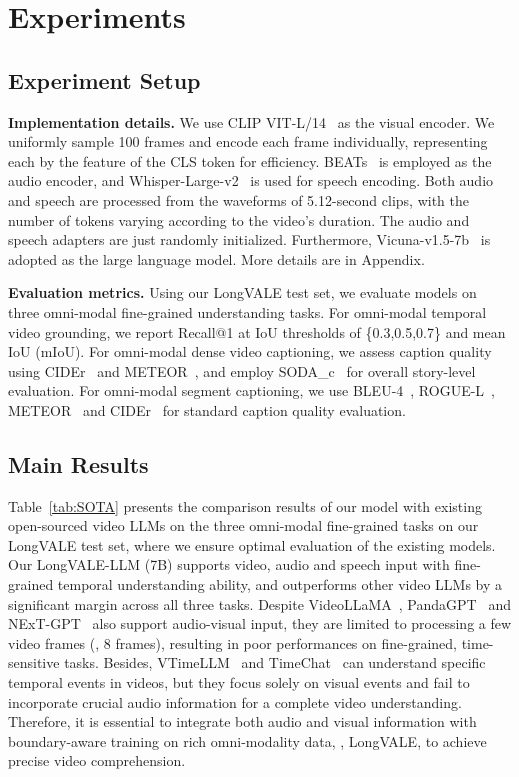 \section{Experiments}


\subsection{Experiment Setup}
\noindent\textbf{Implementation details.}
We use CLIP VIT-L/14~\cite{radford2021learning} as the visual encoder. We uniformly sample 100 frames and encode each frame individually, representing each by the feature of the CLS token for efficiency. BEATs~\cite{chen2022beats} is employed as the audio encoder, and Whisper-Large-v2~\cite{radford2023robust} is used for speech encoding. Both audio and speech are processed from the waveforms of 5.12-second clips, with the number of tokens varying according to the video's duration. 
The audio and speech adapters are just randomly initialized. Furthermore, Vicuna-v1.5-7b~\cite{chiang2023vicuna} is adopted as the large language model. {\color{black} More details are in Appendix}.


\noindent\textbf{Evaluation metrics.}
Using our LongVALE test set, we evaluate models on three omni-modal fine-grained understanding tasks.
For omni-modal temporal video grounding, we report Recall@1 at IoU thresholds of \{0.3,0.5,0.7\} and mean IoU (mIoU).
For omni-modal dense video captioning, we assess caption quality using CIDEr~\cite{vedantam2015cider} and METEOR~\cite{banerjee2005meteor}, and employ SODA\_c~\cite{fujita2020soda} for overall story-level evaluation.
For omni-modal segment captioning, we use BLEU-4~\cite{papineni2002bleu}, ROGUE-L~\cite{lin2004automatic}, METEOR~\cite{banerjee2005meteor} and CIDEr~\cite{vedantam2015cider} for standard caption quality evaluation. 


\subsection{Main Results}
Table~\ref{tab:SOTA} presents the comparison results of our model with existing open-sourced video LLMs on the three omni-modal fine-grained tasks on our LongVALE test set, where we ensure optimal evaluation of the existing models.
Our LongVALE-LLM (7B) supports video, audio and speech input with fine-grained temporal understanding ability, and outperforms other video LLMs by a significant margin across all three tasks.
Despite VideoLLaMA~\cite{zhang2023video}, PandaGPT~\cite{su2023pandagpt} and NExT-GPT~\cite{wu2023next} also support audio-visual input, they are limited to processing a few video frames (\eg, 8 frames), resulting in poor performances on fine-grained, time-sensitive tasks. 
Besides, VTimeLLM~\cite{huang2024vtimellm} and TimeChat~\cite{ren2024timechat} can understand specific temporal events in videos, but they focus solely on visual events and fail to incorporate crucial audio information for a complete video understanding. 
Therefore, it is essential to integrate both audio and visual information with boundary-aware training on rich omni-modality data, \ie, LongVALE, to achieve precise video comprehension.

